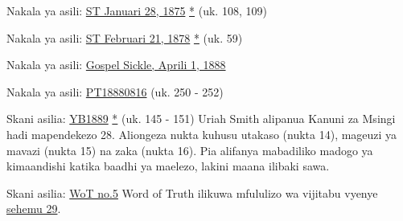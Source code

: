 

Nakala ya asili: \href{https://documents.adventistarchives.org/Periodicals/ST/ST18750128-V01-14.pdf#search=ST18750128}{ST Januari 28, 1875} \href{https://forgotten-pillar.s3.us-east-2.amazonaws.com/ST18750128-V01-14.pdf}{*} (uk. 108, 109)





Nakala ya asili: \href{https://documents.adventistarchives.org/Periodicals/ST/ST18780221-V04-08.pdf#search=%22As%20already%20stated%2C%20S%2E%20D%2E%20Adventists%22}{ST Februari 21, 1878} \href{https://forgotten-pillar.s3.us-east-2.amazonaws.com/ST18780221-V04-08.pdf}{*} (uk. 59)





Nakala ya asili: \href{https://adventistdigitallibrary.org/adl-410336/gospel-sickle-april-1-1888?view_only=true&solr_nav%5Bid%5D=ff4d7f3f77b9bdf9e9ac&solr_nav%5Bpage%5D=0&solr_nav%5Boffset%5D=6}{Gospel Sickle, Aprili 1, 1888}




Nakala ya asili: \href{https://adventistdigitallibrary.org/adl-402854/present-truth-august-16-1888?view_only=true&solr_nav%5Bid%5D=ff4d7f3f77b9bdf9e9ac&solr_nav%5Bpage%5D=0&solr_nav%5Boffset%5D=13}{PT18880816} (uk. 250 - 252)




Skani asilia: \href{https://documents.adventistarchives.org/Yearbooks/YB1889.pdf#search=Yearbook%201889}{YB1889} \href{https://forgotten-pillar.s3.us-east-2.amazonaws.com/YB1889.pdf}{*} (uk. 145 - 151) Uriah Smith alipanua Kanuni za Msingi hadi mapendekezo 28. Aliongeza nukta kuhusu utakaso (nukta 14), mageuzi ya mavazi (nukta 15) na zaka (nukta 16). Pia alifanya mabadiliko madogo ya kimaandishi katika baadhi ya maelezo, lakini maana ilibaki sawa.



Skani asilia: \href{https://adl.b2.adventistdigitallibrary.org/concern/published_works/4ffda25e-a06b-48d4-8ace-67cdcd33726f}{WoT no.5}
Word of Truth ilikuwa mfululizo wa vijitabu vyenye \href{https://adl.b2.adventistdigitallibrary.org/concern/parent/22267078_fundamental_principles_of_seventh_day_adventists/published_works/94a22141-33e8-4b9a-b397-2fe48c17bec4}{sehemu 29}.


